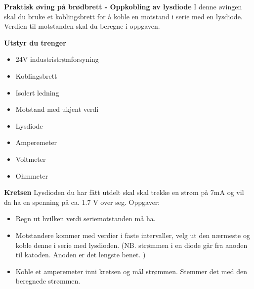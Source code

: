 

\large \textbf{Praktisk øving på brødbrett - Oppkobling av lysdiode }
\normalsize 
\vskip 10pt 
I denne øvingen skal du bruke et koblingsbrett for å koble en motstand i serie med en lysdiode. Verdien til motstanden skal du beregne i oppgaven. 

\vskip 10pt 
\large \textbf{Utstyr du trenger}

\vskip 10pt 
\begin{itemize}[noitemsep]

\item 24V industristrømforsyning
\item Koblingsbrett
\item Isolert ledning
\item Motstand med ukjent verdi 
\item Lysdiode
\item Amperemeter
\item Voltmeter
\item Ohmmeter
\end{itemize}


\large \textbf{Kretsen}
\normalsize
\vskip 10pt 
Lysdioden du har fått utdelt skal skal trekke en strøm på 7mA og vil da ha en spenning på ca. 1.7 V over seg. 
Oppgaver:
\begin{itemize}[noitemsep]
	\item Regn ut hvilken verdi seriemotstanden må ha. 
	\item Motstandere kommer med verdier i faste intervaller, velg ut den nærmeste og koble denne i serie med lysdioden. (NB. strømmen i en diode går fra anoden til katoden. Anoden er det lengste benet. )
	\item Koble et amperemeter inni kretsen og mål strømmen. Stemmer det med den beregnede strømmen. 
\end{itemize}




















